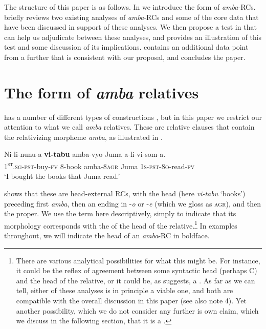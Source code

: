 \documentclass[output=paper,modfonts,nonflat,
colorlinks, citecolor=brown,
]{langsci/langscibook}
\begin{document}
The structure of this paper is as follows. In  we introduce the form of \textit{amba}{}-RCs.  briefly reviews two existing analyses of \textit{amba}{}-RCs and some of the core data that have been discussed in support of these analyses. We then propose a test in  that can help us adjudicate between these analyses, and  provides an illustration of this test and some discussion of its implications.  contains an additional data point from a further  that is consistent with our proposal, and  concludes the paper. 

\section{The form of \textit{amba} relatives}\label{sec:gould:2}
 
 has a number of different types of  constructions \citep[cf.][]{Ngonyani2001}, but in this paper we restrict our attention to what we call \textit{amba} relatives. These are relative clauses that contain the relativizing morpheme \textit{amba}, as illustrated in . 
 
\ea
\gll Ni-li-nunu-a \textbf{vi-tabu} amba-vyo Juma a-li-vi-som-a.\\
\textsc{1\textsuperscript{st}}\textsc{.sg-pst}{}-buy-\textsc{fv} 8-book amba{}-8\textsc{agr} Juma \textsc{1s-pst-8o}{}-read-\textsc{fv}\\
\glt ‘I bought the books that Juma read.’  \label{ex:gould:1}
\z

 shows that these are head-external RCs, with the head (here \textit{vi-tabu} ‘books’) preceding first \textit{amba}, then an  ending in -\textit{o} or -\textit{e} (which we gloss as \textsc{agr}), and then the  proper.   We use the term  here descriptively, simply to indicate that its morphology corresponds  with the  of the head of the relative.\footnote{There are various analytical possibilities for what this  might be. For instance, it could be the reflex of agreement between some syntactic head (perhaps C) and the head of the relative, or it could be, as \citet{Henderson2006} suggests, a . As far as we can tell, either of these analyses is in principle a viable one, and both are compatible with the overall discussion in this paper (see also note 4). Yet another possibility, which we do not consider any further is  own claim, which we discuss in the following section, that it is a .} In examples throughout, we will indicate the head of an \textit{amba}{}-RC in boldface.
\end{document}

